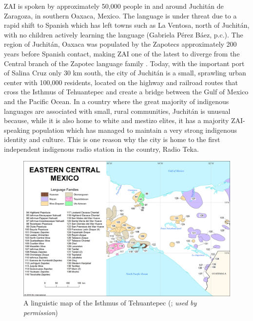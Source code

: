ZAI is spoken by approximately 50,000 people in and around Juchit\'{a}n de Zaragoza, in southern Oaxaca, Mexico. The language is under threat due to a rapid shift to Spanish which has left towns such as La Ventosa, north of Juchit\'{a}n, with no children actively learning the language (Gabriela P\'{e}rez B\'{a}ez, p.c.). The region of Juchit\'{a}n, Oaxaca was populated by the Zapotecs approximately 200 years before Spanish contact, making ZAI one of the latest to diverge from the Central branch of the Zapotec language family \citep{rendon1995}. Today, with the important port of Salina Cruz only 30 km south, the city of Juchit\'{a}n is a small, sprawling urban center with 100,000 residents, located on the highway and railroad routes that cross the Isthmus of Tehuantepec and create a bridge between the Gulf of Mexico and the Pacific Ocean. In a country where the great majority of indigenous languages are associated with small, rural communities, Juchit\'{a}n is unusual because, while it is also home to white and mestizo elites, it has a majority ZAI-speaking population which has managed to maintain a very strong indigenous identity and culture. This is one reason why the city is home to the first independent indigenous radio station in the country, Radio Teka. 




\begin{figure}
\includegraphics[height=.4\textheight]{mapa3.png}
\caption{\small{A linguistic map of the Isthmus of Tehuantepec (\cite{lewis2016}; \textit{used by permission})}}
\end{figure}


